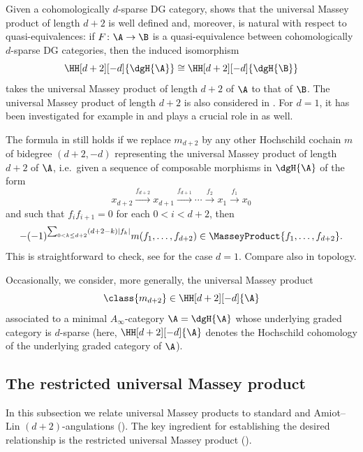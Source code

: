 \documentclass[a4paper]{amsart}
\begin{document}
\begin{remark}
  Given a cohomologically $d$-sparse DG category,
   shows that the universal Massey product
  of length $d+2$ is well defined and, moreover, is natural with respect to
  quasi-equivalences: if $F\colon\A\to\B$ is a quasi-equivalence between
  cohomologically $d$-sparse DG categories, then the induced isomorphism
  \[
    \HH[d+2][-d]{\dgH{\A}}\cong \HH[d+2][-d]{\dgH{\B}}
  \]
  takes the universal Massey product of length $d+2$ of $\A$ to that of $\B$.
  The universal Massey product of length $d+2$ is also considered in \cite[Ch.~3]{Sei15}.
  For $d=1$, it has been investigated for example in
  \cite{BKS04,Kad82} and plays a crucial role in \cite{Mur22} as well. 
\end{remark}

\begin{remark}
  \label{rmk:take_any_cocycle_representing_UMP}
  The formula in  still holds if we replace $m_{d+2}$ by any other Hochschild cochain $m$ of bidegree $(d+2,-d)$ representing the universal
  Massey product of length $d+2$ of $\A$, i.e.~given a sequence of composable morphisms in $\dgH{\A}$ of the form
  \[
    x_{d+2}\xrightarrow{f_{d+2}}x_{d+1}\xrightarrow{f_{d+1}}\cdots\xrightarrow{f_2}x_1\xrightarrow{f_1}x_0
  \]
  and such that $f_if_{i+1}=0$ for each $0<i<d+2$, then
  \[
    -(-1)^{\sum_{0< k\leq
        d+2}(d+2-k)|f_k|}m(f_1,\dots,f_{d+2})\in\MasseyProduct{f_1,\dots,f_{d+2}}.
  \]
  This is straightforward to check, see \cite[Lem.~5.14]{BKS04} for the case $d=1$. Compare also \cite[Thm.~3.3]{BD89} in topology.
\end{remark}

\begin{remark}
  Occasionally, we consider, more generally, the universal Massey product
  \[
    \class{m_{d+2}}\in\HH[d+2][-d]{\A}
  \]
  associated to a minimal $A_\infty$-category $\A=\dgH{\A}$ whose underlying
  graded category is $d$-sparse (here, $\HH[d+2][-d]{\A}$ denotes the Hochschild
  cohomology of the underlying graded category of $\A$).
\end{remark}

\subsection{The restricted universal Massey product}

In this subsection we relate universal Massey products to standard and
Amiot--Lin $(d+2)$-angulations (). The key ingredient
for establishing the desired relationship is the restricted universal Massey
product ().
\end{document}
